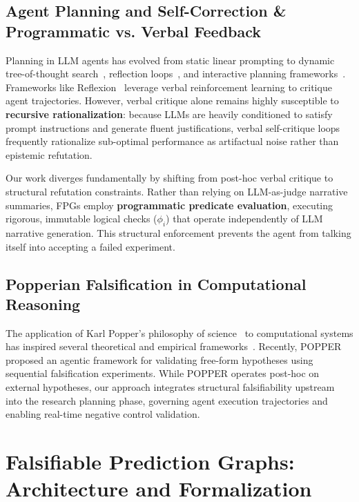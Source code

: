 \documentclass[11pt,letterpaper]{article}
\begin{document}
\subsection{Agent Planning and Self-Correction \& Programmatic vs. Verbal Feedback}
Planning in LLM agents has evolved from static linear prompting to dynamic tree-of-thought search~\citep{Yao2023}, reflection loops~\citep{Shinn2023}, and interactive planning frameworks~\citep{Wang2023}. Frameworks like Reflexion~\citep{Shinn2023} leverage verbal reinforcement learning to critique agent trajectories. However, verbal critique alone remains highly susceptible to \textbf{recursive rationalization}: because LLMs are heavily conditioned to satisfy prompt instructions and generate fluent justifications, verbal self-critique loops frequently rationalize sub-optimal performance as artifactual noise rather than epistemic refutation.

Our work diverges fundamentally by shifting from post-hoc verbal critique to structural refutation constraints. Rather than relying on LLM-as-judge narrative summaries, FPGs employ \textbf{programmatic predicate evaluation}, executing rigorous, immutable logical checks ($\phi_i$) that operate independently of LLM narrative generation. This structural enforcement prevents the agent from talking itself into accepting a failed experiment.

\subsection{Popperian Falsification in Computational Reasoning}
The application of Karl Popper's philosophy of science~\citep{Popper1959} to computational systems has inspired several theoretical and empirical frameworks~\citep{Popper1959}. Recently, POPPER~\citep{Huang2025} proposed an agentic framework for validating free-form hypotheses using sequential falsification experiments. While POPPER operates post-hoc on external hypotheses, our approach integrates structural falsifiability upstream into the research planning phase, governing agent execution trajectories and enabling real-time negative control validation.

\section{Falsifiable Prediction Graphs: Architecture and Formalization}
\end{document}
